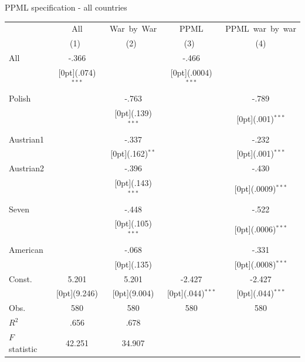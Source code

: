 \documentclass[12pt,a4paper,titlepage]{article}
\begin{document}
{\caption{PPML specification - all countries}
\begin{tabular*}{\textwidth}{@{\extracolsep{\fill}}lcccc}				
	& \multicolumn{1}{c}{All} &	\multicolumn{1}{c}{War~by~War} &	\multicolumn{1}{c}{PPML} &	\multicolumn{1}{c}{PPML~war~by~war} \\
\cline{2-5}				
	& \multicolumn{1}{c}{(1)\mbox{\ }} &	\multicolumn{1}{c}{(2)\mbox{\ }} &	\multicolumn{1}{c}{(3)\mbox{\ }} &	\multicolumn{1}{c}{(4)} \\
\hline				
All &	-.366 &	&	-.466 &	\\
&	\raisebox{.7ex}[0pt]{\scriptsize (.074)$^{***}$} &	&	\raisebox{.7ex}[0pt]{\scriptsize (.0004)$^{***}$} &	\\
Polish &	&	-.763 &	&	-.789 \\
&	&	\raisebox{.7ex}[0pt]{\scriptsize (.139)$^{***}$} &	&	\raisebox{.7ex}[0pt]{\scriptsize (.001)$^{***}$} \\
Austrian1 &	&	-.337 &	&	-.232 \\
&	&	\raisebox{.7ex}[0pt]{\scriptsize (.162)$^{**}$} &	&	\raisebox{.7ex}[0pt]{\scriptsize (.001)$^{***}$} \\
Austrian2 &	&	-.396 &	&	-.430 \\
&	&	\raisebox{.7ex}[0pt]{\scriptsize (.143)$^{***}$} &	&	\raisebox{.7ex}[0pt]{\scriptsize (.0009)$^{***}$} \\
Seven &	&	-.448 &	&	-.522 \\
&	&	\raisebox{.7ex}[0pt]{\scriptsize (.105)$^{***}$} &	&	\raisebox{.7ex}[0pt]{\scriptsize (.0006)$^{***}$} \\
American &	&	-.068 &	&	-.331 \\
&	&	\raisebox{.7ex}[0pt]{\scriptsize (.135)} &	&	\raisebox{.7ex}[0pt]{\scriptsize (.0008)$^{***}$} \\
Const. &	5.201 &	5.201 &	-2.427 &	-2.427 \\
&	\raisebox{.7ex}[0pt]{\scriptsize (9.246)} &	\raisebox{.7ex}[0pt]{\scriptsize (9.004)} &	\raisebox{.7ex}[0pt]{\scriptsize (.044)$^{***}$} &	\raisebox{.7ex}[0pt]{\scriptsize (.044)$^{***}$} \\
Obs. &	580 &	580 &	580 &	580 \\
$ R^2$ &	.656 &	.678 &	&	\\
$ F$ statistic &	42.251 &	34.907 &	&	\\
\hline\hline				
\end{tabular*}%

}
\end{document}
